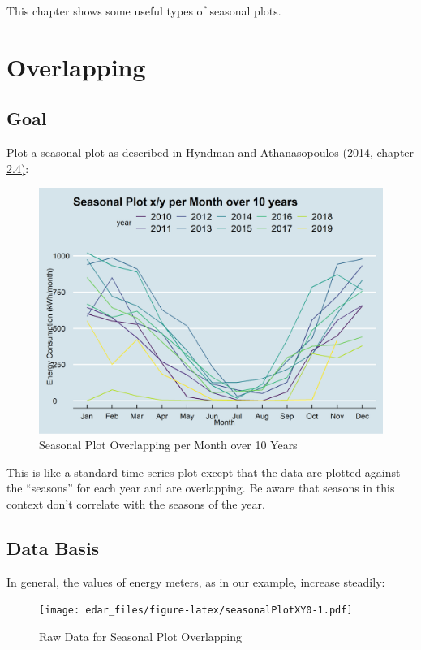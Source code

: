 \documentclass[
]{book}
\begin{document}
This chapter shows some useful types of seasonal plots.

\hypertarget{overlapping}{%
\section{Overlapping}\label{overlapping}}

\hypertarget{goal}{%
\subsection{Goal}\label{goal}}

Plot a seasonal plot as described in \href{https://otexts.com/fpp2/seasonal-plots.html}{Hyndman and Athanasopoulos (2014, chapter 2.4)}:

\begin{figure}
\includegraphics[width=0.7\linewidth]{images/plotSeasonalXY} \caption{Seasonal Plot Overlapping per Month over 10 Years}\label{fig:unnamed-chunk-9}
\end{figure}

This is like a standard time series plot except that the data are plotted against the ``seasons'' for each year and are overlapping. Be aware that seasons in this context don't correlate with the seasons of the year.

\hypertarget{data-basis}{%
\subsection{Data Basis}\label{data-basis}}

In general, the values of energy meters, as in our example, increase steadily:

\begin{figure}
\centering
\texttt{[image: edar\_files/figure-latex/seasonalPlotXY0-1.pdf]}
\caption{\label{fig:seasonalPlotXY0}Raw Data for Seasonal Plot Overlapping}
\end{figure}
\end{document}
